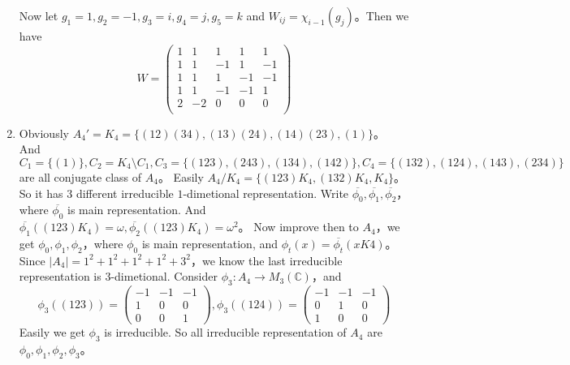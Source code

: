 \documentclass{ctexart}
\begin{document}
\begin{solution}
\begin{enumerate}
      Now let \(g_1 = 1,g_2 = -1,g_3 = i,g_4 = j,g_5 = k\) and \(W_{ij}=\chi_{i-1}( g_j)\)\nolinebreak[4]。Then we have
      \[
        W=
        \begin{pmatrix}
          1 & 1  & 1  & 1  & 1  \\
          1 & 1  & -1 & 1  & -1 \\
          1 & 1  & 1  & -1 & -1 \\
          1 & 1  & -1 & -1 & 1  \\
          2 & -2 & 0  & 0  & 0  \\
        \end{pmatrix}
      \]
    \item
      Obviously \(A_4'=K_4=\{(1 2)(3 4),(1 3)(2 4),(1 4)(2 3),(1)\}\)\nolinebreak[4]。
      And \(C_1=\{(1)\}, C_2=K_4 \setminus C_1,C_3=\{(1 2 3),(243),(134),(142)\}, C_4=\{(132),(124),(143),(234)\}\) are all conjugate class of \(A_4\)\nolinebreak[4]。
      Easily \(A_4/K_4=\{(123)K_4,(132)K_4,K_4\}\)\nolinebreak[4]。So it has \(3\) different irreducible \(1\)-dimetional representation.
      Write \(\overline{\phi_0},\overline{\phi_1},\overline{\phi_2}\)\nolinebreak[4]，where \(\overline{\phi_0}\) is main representation.
      And \(\overline{\phi_1}((123)K_4)=\omega,\overline{\phi_2}((123)K_4)=\omega^2\)\nolinebreak[4]。
      Now improve then to \(A_4\)\nolinebreak[4]，we get \(\phi_0,\phi_1,\phi_2\)\nolinebreak[4]，where \(\phi_0\) is main representation, and
      \(\phi_t(x)=\overline{\phi_t}(xK4)\)\nolinebreak[4]。
      Since \(|A_4|=1^2+1^2+1^2+1^2+3^2\)\nolinebreak[4]，we know the last irreducible representation is \(3\)-dimetional.
      Consider \(\phi_3:A_4 \to M_3(\mathbb{C})\)\nolinebreak[4]，and
      \[
        \phi_3((123))=
        \begin{pmatrix}
          -1 & -1 & -1 \\
          1  & 0  & 0  \\
          0  & 0  & 1
        \end{pmatrix}, \phi_3((124))=
        \begin{pmatrix}
          -1 & -1 & -1 \\
          0  & 1  & 0  \\
          1  & 0  & 0
        \end{pmatrix}
      \]
      Easily we get \(\phi_3\) is irreducible. So all irreducible representation of \(A_4\) are \(\phi_0,\phi_1,\phi_2,\phi_3\)\nolinebreak[4]。


\end{enumerate}
\end{solution}
\end{document}
